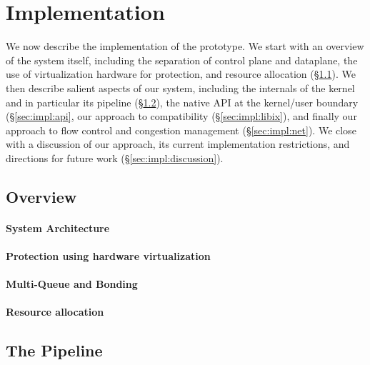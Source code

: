 
\section{Implementation}
\label{sec:impl}

We now describe the implementation of the \ix prototype. We start with
an overview of the system itself, including the separation of control
plane and dataplane, the use of virtualization hardware for
protection, and resource allocation (\S\ref{sec:impl:overview}). We
then describe salient aspects of our system, including the internals
of the \ix kernel and in particular its pipeline
(\S\ref{sec:impl:kernel}), the native API at the kernel/user boundary
(\S\ref{sec:impl:api}, our approach to compatibility
(\S\ref{sec:impl:libix}), and finally our approach to flow control and
congestion management (\S\ref{sec:impl:net}).  We close with a
discussion of our approach, its current implementation restrictions,
and directions for future work (\S\ref{sec:impl:discussion}).


\subsection{Overview}
\label{sec:impl:overview}

\paragraph{System Architecture}



\paragraph{Protection using hardware virtualization}


\paragraph{Multi-Queue and Bonding}


%


\paragraph{Resource allocation}


\subsection{The \ix Pipeline}
\label{sec:impl:kernel}

